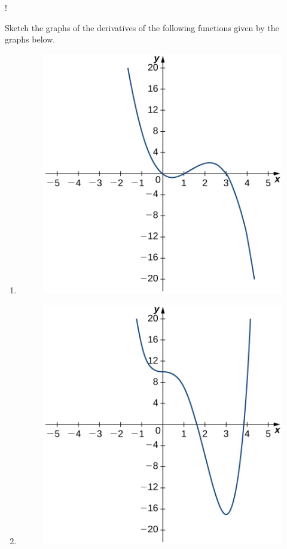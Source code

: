 \documentclass[12pt]{amsart}
\begin{document}
\newpage!
\begin{question}
	Sketch the graphs of the derivatives of the following functions given by the graphs below.
	\begin{enumerate}
		\item
		      \begin{figure}[!ht]
			      \includegraphics{figures/1.jpeg}
		      \end{figure}
		      \vspace{2cm}

		\item \begin{figure}[!ht]
			      \includegraphics{figures/2.jpeg}
		      \end{figure}
		      \vspace{2cm}


\end{enumerate}
\end{question}
\end{document}
